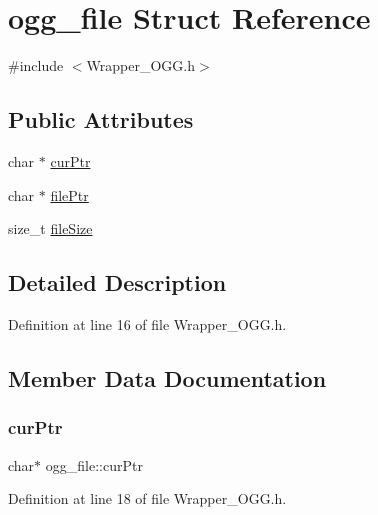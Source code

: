 \hypertarget{structogg__file}{}\section{ogg\+\_\+file Struct Reference}
\label{structogg__file}


{\ttfamily \#include $<$Wrapper\+\_\+\+O\+G\+G.\+h$>$}

\subsection*{Public Attributes}
\begin{DoxyCompactItemize}
\item 
char $\ast$ \mbox{\hyperlink{structogg__file_a1d79fed1cd34a17c415ea361795dcf6e}{cur\+Ptr}}
\item 
char $\ast$ \mbox{\hyperlink{structogg__file_a6fc2ba03266798a26d28b944d9455aac}{file\+Ptr}}
\item 
size\+\_\+t \mbox{\hyperlink{structogg__file_a96db2da70b0fc374045245e7c77077ed}{file\+Size}}
\end{DoxyCompactItemize}


\subsection{Detailed Description}


Definition at line 16 of file Wrapper\+\_\+\+O\+G\+G.\+h.



\subsection{Member Data Documentation}
\mbox{\label{structogg__file_a1d79fed1cd34a17c415ea361795dcf6e}} 
\subsubsection{\texorpdfstring{cur\+Ptr}{curPtr}}
{\footnotesize\ttfamily char$\ast$ ogg\+\_\+file\+::cur\+Ptr}



Definition at line 18 of file Wrapper\+\_\+\+O\+G\+G.\+h.

\mbox{\label{structogg__file_a6fc2ba03266798a26d28b944d9455aac}} 
